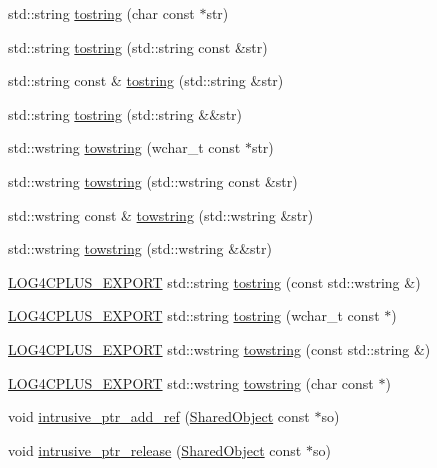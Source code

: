 \begin{DoxyCompactItemize}
\item 
std\-::string \hyperlink{namespacelog4cplus_1_1helpers_a6389b24412a4f7bc49b4ea3efb8aff63}{tostring} (char const $\ast$str)
\item 
std\-::string \hyperlink{namespacelog4cplus_1_1helpers_a8c0f9cc5cee715514a1514d56f0833f0}{tostring} (std\-::string const \&str)
\item 
std\-::string const \& \hyperlink{namespacelog4cplus_1_1helpers_ac8fddba0683ced65297a1e1b057182f0}{tostring} (std\-::string \&str)
\item 
std\-::string \hyperlink{namespacelog4cplus_1_1helpers_a34d0ffa5c5af620670bdf71c740e0751}{tostring} (std\-::string \&\&str)
\item 
std\-::wstring \hyperlink{namespacelog4cplus_1_1helpers_a16c11d76fa2abafe31072a3e76883c64}{towstring} (wchar\-\_\-t const $\ast$str)
\item 
std\-::wstring \hyperlink{namespacelog4cplus_1_1helpers_af33dba2b59d969e99a800319d416ffee}{towstring} (std\-::wstring const \&str)
\item 
std\-::wstring const \& \hyperlink{namespacelog4cplus_1_1helpers_a18a76d302c9e9a7f7e50135af386f8ae}{towstring} (std\-::wstring \&str)
\item 
std\-::wstring \hyperlink{namespacelog4cplus_1_1helpers_a77368f05a01329131301039ec65f2e14}{towstring} (std\-::wstring \&\&str)
\item 
\hyperlink{config_8hxx_ab13cb1a5317c245ee2ef4f2bfe0cfb2d}{L\-O\-G4\-C\-P\-L\-U\-S\-\_\-\-E\-X\-P\-O\-R\-T} std\-::string \hyperlink{namespacelog4cplus_1_1helpers_ade49c682216c83f6850ac9d0cdf11035}{tostring} (const std\-::wstring \&)
\item 
\hyperlink{config_8hxx_ab13cb1a5317c245ee2ef4f2bfe0cfb2d}{L\-O\-G4\-C\-P\-L\-U\-S\-\_\-\-E\-X\-P\-O\-R\-T} std\-::string \hyperlink{namespacelog4cplus_1_1helpers_a841a1a648f80f2eb5c0806de1d23dfe7}{tostring} (wchar\-\_\-t const $\ast$)
\item 
\hyperlink{config_8hxx_ab13cb1a5317c245ee2ef4f2bfe0cfb2d}{L\-O\-G4\-C\-P\-L\-U\-S\-\_\-\-E\-X\-P\-O\-R\-T} std\-::wstring \hyperlink{namespacelog4cplus_1_1helpers_a693c9e33224167abec16d98e08399993}{towstring} (const std\-::string \&)
\item 
\hyperlink{config_8hxx_ab13cb1a5317c245ee2ef4f2bfe0cfb2d}{L\-O\-G4\-C\-P\-L\-U\-S\-\_\-\-E\-X\-P\-O\-R\-T} std\-::wstring \hyperlink{namespacelog4cplus_1_1helpers_aa1614cdfb05835a90b683dffaebe85f8}{towstring} (char const $\ast$)
\end{DoxyCompactItemize}
{\bf }\par
\begin{DoxyCompactItemize}
\item 
void \hyperlink{namespacelog4cplus_1_1helpers_a473255d4f61eb0672b86568c828aa768}{intrusive\-\_\-ptr\-\_\-add\-\_\-ref} (\hyperlink{classlog4cplus_1_1helpers_1_1SharedObject}{Shared\-Object} const $\ast$so)
\item 
void \hyperlink{namespacelog4cplus_1_1helpers_ad52e2bb20a279dfba2bcd48bb33c6c74}{intrusive\-\_\-ptr\-\_\-release} (\hyperlink{classlog4cplus_1_1helpers_1_1SharedObject}{Shared\-Object} const $\ast$so)
\end{DoxyCompactItemize}

